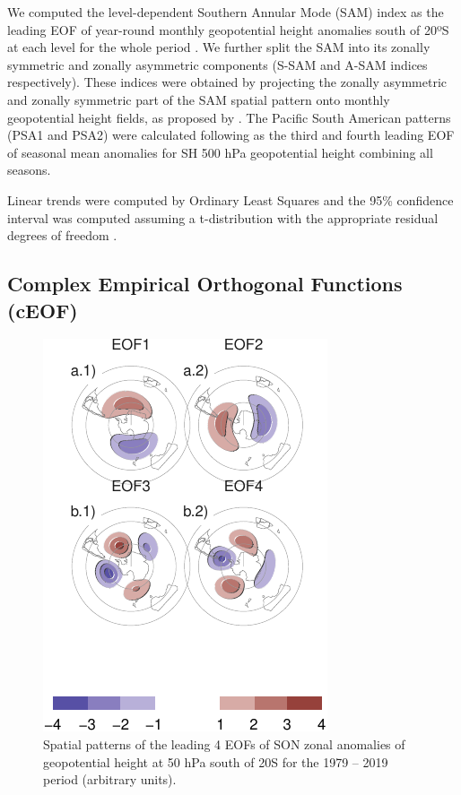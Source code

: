 \documentclass[smallextended]{svjour3}       %
\begin{document}
We computed the level-dependent Southern Annular Mode (SAM) index as the leading EOF of year-round monthly geopotential height anomalies south of 20ºS at each level for the whole period \citep{baldwin2009}.
We further split the SAM into its zonally symmetric and zonally asymmetric components (S-SAM and A-SAM indices respectively).
These indices were obtained by projecting the zonally asymmetric and zonally symmetric part of the SAM spatial pattern onto monthly geopotential height fields, as proposed by \citet{campitelli2021}.
The Pacific South American patterns (PSA1 and PSA2) were calculated following \citet{mo2001} as the third and fourth leading EOF of seasonal mean anomalies for SH 500 hPa geopotential height combining all seasons.

Linear trends were computed by Ordinary Least Squares and the 95\% confidence interval was computed assuming a t-distribution with the appropriate residual degrees of freedom \citep{wilks2011r}.

\hypertarget{complex-empirical-orthogonal-functions-ceof}{%
\subsection{Complex Empirical Orthogonal Functions (cEOF)}\label{complex-empirical-orthogonal-functions-ceof}}



\begin{figure}
\centering
\includegraphics{../figures/eof-naive-1.pdf}
\caption{\label{fig:eof-naive}Spatial patterns of the leading 4 EOFs of SON zonal anomalies of geopotential height at 50 hPa south of 20\degree S for the 1979 -- 2019 period (arbitrary units).}
\end{figure}
\end{document}
